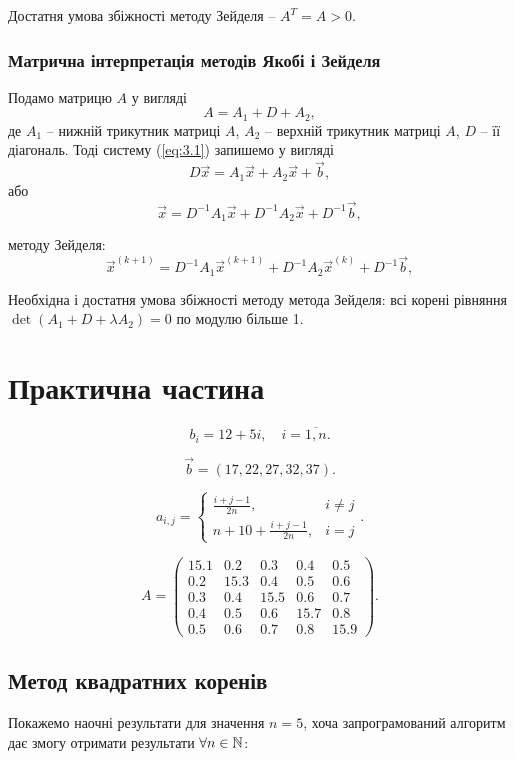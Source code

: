 Достатня умова збіжності методу Зейделя -- $A^T = A > 0$.

\subsubsection{Матрична інтерпретація методів Якобі і Зейделя}

Подамо матрицю $A$ у вигляді \[ A = A_1 + D + A_2, \]
де $A_1$ -- нижній трикутник матриці $A$, $A_2$ -- верхній трикутник матриці $A$, $D$ -- її
діагональ. Тоді систему (\ref{eq:3.1}) запишемо у вигляді \[ D \vec x = A_1 \vec x + A_2 \vec x + \vec b,\]
або
\[ \vec x = D^{-1} A_1 \vec x + D^{-1} A_2 \vec x + D^{-1} \vec b,\]
 
методу Зейделя:
\[ \vec x^{(k+1)} = D^{-1} A_1 \vec x^{(k+1)} + D^{-1} A_2 \vec x^{(k)} + D^{-1} \vec b,\]

Необхідна і достатня умова збіжності методу метода Зейделя: всі корені рівняння $\det(A_1 + D + \lambda A_2) = 0$ по модулю більше 1.

\section{Практична частина}

\[ b_i = 12 + 5 i, \quad i = \overline{1, n}. \]

\[ \vec b = (17, 22, 27, 32, 37). \]

\[ a_{i,j} = \begin{cases} \frac{i+j-1}{2n}, & i \ne j \\ n + 10 + \frac{i+j-1}{2n}, & i = j \end{cases}. \]

\[ A = \begin{pmatrix} 15.1 & 0.2 & 0.3 & 0.4 & 0.5 \\ 0.2 & 15.3 & 0.4 & 0.5 & 0.6 \\ 0.3 & 0.4 & 15.5 & 0.6 & 0.7 \\ 0.4 & 0.5 & 0.6 & 15.7 & 0.8 \\ 0.5 & 0.6 & 0.7 & 0.8 & 15.9 \end{pmatrix}. \]

\subsection{Метод квадратних коренів}

Покажемо наочні результати для значення $n = 5$, хоча запрограмований алгоритм дає змогу отримати результати $\forall n \in \mathbb{N}$:

